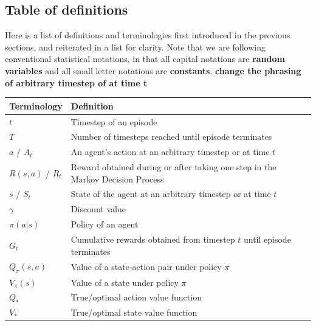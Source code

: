 \documentclass[12pt]{report}
\begin{document}
\subsection{Table of definitions}
Here is a list of definitions and terminologies first introduced in the previous sections, and reiterated in a list for clarity. Note that we are following conventional statistical notations, in that all capital notations are \textbf{random variables} and all small letter notations are \textbf{constants}. 
\textbf{change the phrasing of arbitrary timestep of at time t}
\begin{center}
    \begin{tabular}{ l | p{10cm} }
    \small
    Terminology & Definition \\ \hline
    $t$ & Timestep of an episode \\
    $T$ & Number of timesteps reached until episode terminates \\
    $a$ / $A_t$ & An agent's action at an arbitrary timestep or at time $t$\\ 
    $R(s,a)$ / $R_t$ & Reward obtained during or after taking one step in the Markov Decision Process\\ 
    $s$ / $S_t$ & State of the agent at an arbitrary timestep or at time $t$ \\
    $\gamma$ & Discount value \\ 
    $\pi(a|s)$ & Policy of an agent \\ 
    $G_t$ & Cumulative rewards obtained from timestep $t$ until episode terminates \\ 
    $Q_\pi(s,a)$ & Value of a state-action pair under policy $\pi$ \\ 
    $V_\pi(s)$ & Value of a state under policy $\pi$ \\ 
    $Q_*$ & True/optimal action value function\\
    $V_*$ & True/optimal state value function
    \end{tabular}
\end{center}
\end{document}
